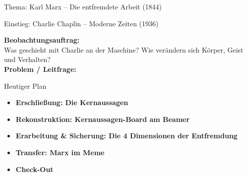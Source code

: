 \documentclass{beamer}
\author{Herr \textbf{Dayi}}
\institute{Philosophie Q1}
\date{}
\begin{document}

\begin{frame}[t]{Thema: Karl Marx -- Die entfremdete Arbeit (1844)}
\end{frame}

\begin{frame}[t]{\faFilm \enskip Einstieg: Charlie Chaplin -- Moderne Zeiten (1936)}
\vspace{0.4cm}

\textbf{\large \faVideo \enskip Beobachtungsauftrag:}\\[8pt]
\normalsize
Was geschieht mit Charlie an der Maschine? Wie verändern sich Körper, Geist und Verhalten?\\[1.2cm]

\Large \textbf{\faExclamationTriangle \enskip Problem / Leitfrage:}

\vfill

\end{frame}

\begin{frame}[t]{\faListUl \enskip Heutiger Plan}
\vspace*{0.35cm}
\begin{itemize}
    \setlength{\itemsep}{12pt}
    
    \item<1->[1.] \textbf{\large \faQuoteLeft \enskip Erschließung: Die Kernaussagen}
    
    \item<2->[2.] \textbf{\large \faSlidersH \enskip Rekonstruktion: Kernaussagen-Board am Beamer}
    
    \item<3->[3.] \textbf{\large \faProjectDiagram \enskip Erarbeitung \& Sicherung: Die 4 Dimensionen der Entfremdung}
    
    \item<4->[4.] \textbf{\large \faImages \enskip Transfer: Marx im Meme}
    
    \item<5->[5.] \textbf{\large \faCheckCircle \enskip Check-Out}
    
\end{itemize}
\end{frame}
\end{document}
